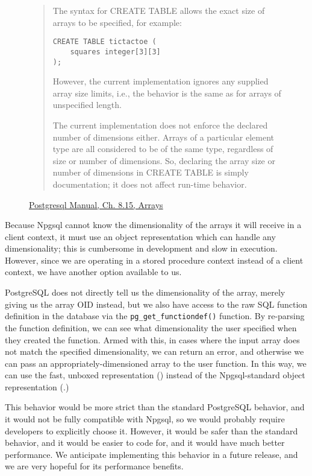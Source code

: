 \documentclass[sigconf,techreport,authorversion,nonacm]{acmart}
\begin{document}
\begin{figure}[h]
\begin{quote}
The syntax for CREATE TABLE allows the exact size of arrays to be
specified, for example:

\begin{verbatim}
CREATE TABLE tictactoe (
    squares integer[3][3]
);
\end{verbatim}

However, the current implementation ignores any supplied array size
limits, i.e., the behavior is the same as for arrays of unspecified
length.

The current implementation does not enforce the declared number of
dimensions either. Arrays of a particular element type are all
considered to be of the same type, regardless of size or number of
dimensions. So, declaring the array size or number of dimensions
in CREATE TABLE is simply documentation; it does not affect run-time
behavior.
\end{quote}
\caption{\href{https://www.postgresql.org/docs/15/arrays.html}{Postgresql Manual, Ch. 8.15, Arrays}}
\end{figure}

Because Npgsql cannot know the dimensionality of the arrays it will
receive in a client context, it must use an object representation
which can handle any dimensionality; this is cumbersome in development
and slow in execution. However, since we are operating in a stored
procedure context instead of a client context, we have another
option available to us.

PostgreSQL does not directly tell us the dimensionality of the
array, merely giving us the array OID instead, but we also have
access to the raw SQL function definition in the database via the
\texttt{pg\_get\_functiondef()} function. By re-parsing
the function definition, we can see what dimensionality the user
specified when they created the function. Armed with this, in cases
where the input array does not match the specified dimensionality,
we can return an error, and otherwise we can pass an
appropriately-dimensioned array to the user function. In this way,
we can use the fast, unboxed representation ()
instead of the Npgsql-standard object representation
(.)

This behavior would be more strict than the standard PostgreSQL
behavior, and it would not be fully compatible with Npgsql, so we
would probably require developers to explicitly choose it.  However,
it would be safer than the standard behavior, and it would be easier
to code for, and it would have much better performance.  We anticipate
implementing this behavior in a future release, and we are very
hopeful for its performance benefits.
\end{document}
